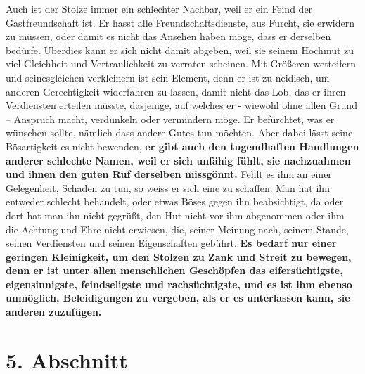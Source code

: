 Auch ist der Stolze immer ein schlechter Nachbar, weil er ein Feind der
Gastfreundschaft
 ist. Er hasst alle
Freundschaftsdienste, aus Furcht, sie erwidern
zu müssen, oder damit es nicht das Ansehen haben möge, dass er derselben
bedürfe.
Überdies kann er sich nicht damit abgeben, weil sie seinem Hochmut zu viel
Gleichheit und Vertraulichkeit zu verraten scheinen. Mit
Größeren wetteifern und
seinesgleichen verkleinern ist sein Element, denn er ist zu neidisch, um
anderen Gerechtigkeit widerfahren zu lassen, damit nicht das Lob, das
er ihren
Verdiensten erteilen müsste, dasjenige, auf welches er - wiewohl ohne allen
Grund -- Anspruch macht, verdunkeln oder vermindern möge. Er befürchtet, was er
wünschen sollte, nämlich dass andere Gutes tun möchten. Aber dabei lässt seine
Bösartigkeit es nicht bewenden, \label{ref:12_04_eitle_menschen_tugent}
\textbf{er gibt auch den tugendhaften Handlungen
anderer schlechte Namen, weil er sich unfähig fühlt, sie nachzuahmen und ihnen
den guten Ruf derselben missgönnt.} Fehlt es ihm an einer Gelegenheit, Schaden
zu
tun, so weiss er sich eine zu schaffen: Man hat ihn entweder schlecht behandelt,
oder etwas Böses gegen ihn beabsichtigt, da oder dort hat man ihn nicht gegrüßt,
den Hut nicht vor ihm abgenommen oder ihm die Achtung und Ehre nicht erwiesen,
die, seiner Meinung nach, seinem Stande, seinen Verdiensten und seinen
Eigenschaften gebührt. \label{ref:12_04_eitle_menschen_beleidigung}
\textbf{Es bedarf nur einer geringen Kleinigkeit, um den
Stolzen
zu Zank und Streit zu bewegen, denn er ist unter allen
menschlichen Geschöpfen
das eifersüchtigste, eigensinnigste, feindseligste und rachsüchtigste, und es
ist ihm ebenso unmöglich, Beleidigungen zu vergeben, als er es unterlassen kann,
sie anderen zuzufügen.}

\section{5. Abschnitt} \label{kap12_ab5}

